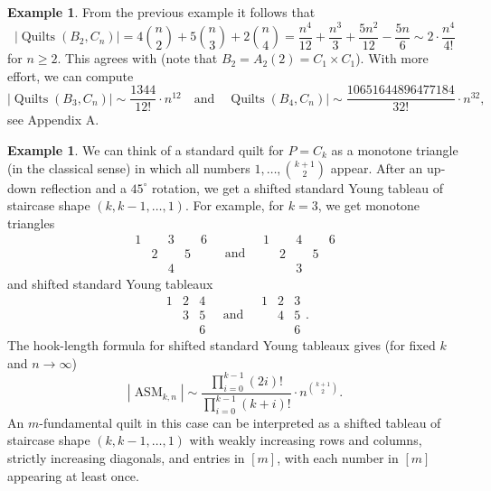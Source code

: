 \documentclass[12pt]{amsart}
\numberwithin{equation}{section}
\theoremstyle{definition}
\newtheorem{example}[theorem]{Example}
\newcommand{\ASM}{\operatorname{ASM}}
\newcommand{\quilt}{\operatorname{Quilts}}
\begin{document}
\begin{example}
 From the previous example it follows that
 $$|\quilt(B_2,C_n)| = 4 \binom n 2 + 5 \binom n 3 + 2 \binom n 4 =
 \frac{n^4}{12}+\frac{n^3}{3}+\frac{5 n^2}{12}-\frac{5 n}{6}
\sim 2 \cdot \frac{n^4}{4!}
$$
 for $n \geq 2$. This agrees with  (note that $B_2 = A_2(2)=C_1 \times C_1$). With more effort, we can compute
 $$|\quilt(B_3,C_n)| \sim \frac{1344}{12!} \cdot n^{12} \quad \text{and} \quad \quilt(B_4,C_n)| \sim \frac{10651644896477184}{32!} \cdot n^{32},$$
 see Appendix A.
\end{example}

\begin{example} \label{ex:rectangularASMs}
 We can think of a standard quilt for $P = C_k$ as a monotone triangle
 (in the classical sense) in which all numbers $1,\ldots,\binom{k+1}2$
 appear. After an up-down reflection and a $45^\circ$ rotation, we get
 a shifted standard Young tableau of staircase shape $(k,k-1,\ldots,1)$. For example, for $k=3$, we get monotone triangles
 $$\begin{array}{ccccc} 1&&3&&6 \\ &2&&5& \\ &&4&& \end{array} \quad \mbox{and} \quad \begin{array}{ccccc} 1&&4&&6 \\ &2&&5& \\ &&3&& \end{array}$$
 and shifted standard Young tableaux
 $$\begin{array}{ccc} 1 & 2 & 4 \\ & 3 & 5 \\ & & 6 \end{array} \quad \mbox{and} \quad \begin{array}{ccc} 1 & 2 & 3 \\ & 4 & 5 \\ & & 6 \end{array}.$$
 The hook-length formula for shifted standard Young tableaux \cite{Thr} gives (for fixed $k$ and $n \to \infty$)
$$|\ASM_{k,n}| \sim \frac{\prod_{i=0}^{k-1} (2i)!}{\prod_{i=0}^{k-1} (k + i)!} \cdot n^{\binom{k+1}2}.$$
 An $m$-fundamental quilt in this case can be interpreted as a shifted tableau of staircase shape $(k,k-1,\ldots,1)$ with weakly increasing rows and columns, strictly increasing diagonals, and entries in $[m]$, with each number in $[m]$ appearing at least once.
\end{example}
\end{document}

